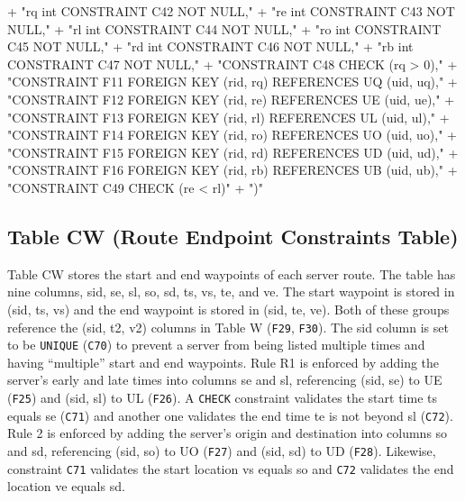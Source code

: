   + "rq  int  CONSTRAINT C42 NOT NULL,"
  + "re  int  CONSTRAINT C43 NOT NULL,"
  + "rl  int  CONSTRAINT C44 NOT NULL,"
  + "ro  int  CONSTRAINT C45 NOT NULL,"
  + "rd  int  CONSTRAINT C46 NOT NULL,"
  + "rb  int  CONSTRAINT C47 NOT NULL,"
  + "CONSTRAINT C48 CHECK (rq > 0),"
  + "CONSTRAINT F11 FOREIGN KEY (rid, rq) REFERENCES UQ (uid, uq),"
  + "CONSTRAINT F12 FOREIGN KEY (rid, re) REFERENCES UE (uid, ue),"
  + "CONSTRAINT F13 FOREIGN KEY (rid, rl) REFERENCES UL (uid, ul),"
  + "CONSTRAINT F14 FOREIGN KEY (rid, ro) REFERENCES UO (uid, uo),"
  + "CONSTRAINT F15 FOREIGN KEY (rid, rd) REFERENCES UD (uid, ud),"
  + "CONSTRAINT F16 FOREIGN KEY (rid, rb) REFERENCES UB (uid, ub),"
  + "CONSTRAINT C49 CHECK (re < rl)"
  + ")"
\nwendcode{}\nwdocspar

\subsection{Table CW (Route Endpoint Constraints Table)}
Table CW stores the start and end waypoints of each server route.  The table
has nine columns, \textsf{sid}, \textsf{se}, \textsf{sl}, \textsf{so},
\textsf{sd}, \textsf{ts}, \textsf{vs}, \textsf{te}, and \textsf{ve}.  The start
waypoint is stored in (\textsf{sid}, \textsf{ts}, \textsf{vs}) and the end
waypoint is stored in (\textsf{sid}, \textsf{te}, \textsf{ve}). Both of these
groups reference the (\textsf{sid}, \textsf{t2}, \textsf{v2}) columns in Table
W ({\tt{}F29}, {\tt{}F30}).  The \textsf{sid} column is set to be \texttt{UNIQUE}
({\tt{}C70}) to prevent a server from being listed multiple times and having
``multiple'' start and end waypoints.  Rule R1 is enforced by adding the
server's early and late times into columns \textsf{se} and \textsf{sl},
referencing (\textsf{sid}, \textsf{se}) to UE ({\tt{}F25}) and (\textsf{sid},
\textsf{sl}) to UL ({\tt{}F26}).  A \texttt{CHECK} constraint validates the start
time \textsf{ts} equals \textsf{se} ({\tt{}C71}) and another one validates the end
time \textsf{te} is not beyond \textsf{sl} ({\tt{}C72}).  Rule 2 is enforced by
adding the server's origin and destination into columns \textsf{so} and
\textsf{sd}, referencing (\textsf{sid}, \textsf{so}) to UO ({\tt{}F27}) and
(\textsf{sid}, \textsf{sd}) to UD ({\tt{}F28}).  Likewise, constraint {\tt{}C71}
validates the start location \textsf{vs} equals \textsf{so} and {\tt{}C72}
validates the end location \textsf{ve} equals \textsf{sd}.
